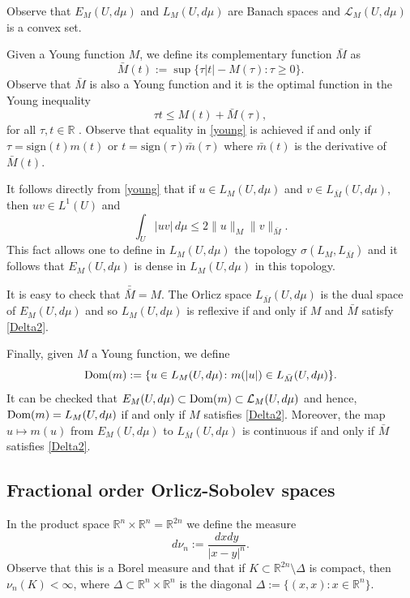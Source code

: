 \documentclass{amsart}
\def\Dom{\text{\normalfont Dom}}
\newcommand{\R}{{\mathbb R}}
\newcommand{\LL}{{\mathcal L}}
\theoremstyle{remark}
\theoremstyle{definition}
\numberwithin{equation}{section}
\begin{document}
Observe that $E_M(U,d\mu)$ and $L_M(U,d\mu)$ are Banach spaces and $\LL_M(U,d\mu)$ is a convex set.

\bigskip

Given a Young function $M$, we define its complementary function $\bar M$ as
$$
\bar M(t) := \sup\{ \tau|t|-M(\tau)\colon \tau\geq 0\}.
$$
Observe that $\bar M$ is also a Young function and it is the optimal function in the Young inequality
\begin{equation}\label{young}
\tau t\le M(t) + \bar M(\tau),
\end{equation}
for all $\tau,t\in \R$ . Observe that equality in \eqref{young} is achieved if and only if $\tau=\text{sign}(t)m(t)$ or $t=\text{sign}(\tau)\bar m(\tau)$ where $\bar{m}(t)$ is the derivative of $\bar{M}(t)$. 

It follows directly from \eqref{young} that if $u\in L_M(U,d\mu)$ and $v\in L_{\bar M}(U,d\mu)$, then $uv\in L^1(U)$ and
$$
\int_U |uv|\, d\mu \le 2 \|u\|_M \|v\|_{\bar M}.
$$
This fact allows one to define in $L_M(U,d\mu)$ the topology $\sigma(L_M,L_{\bar M})$ and it follows that $E_M(U,d\mu)$ is dense in $L_M(U,d\mu)$ in this topology.

It is easy to check that $\bar{\bar M} = M$. The Orlicz space $L_{\bar M}(U,d\mu)$ is the dual space of $E_M(U,d\mu)$ and so $L_M(U,d\mu)$ is reflexive if and only if $M$ and $\bar M$ satisfy \eqref{Delta2}.


Finally, given $M$ a Young function, we define
\begin{equation}\label{Domm}
\Dom(m) := \{u\in L_M(U,d\mu)\colon m(|u|)\in L_{\bar M}(U,d\mu)\}.
\end{equation}
It can be checked that $E_M(U,d\mu)\subset \Dom(m)\subset \LL_M(U,d\mu)$ and hence, $\Dom(m)=L_M(U,d\mu)$ if and only if $M$ satisfies \eqref{Delta2}. Moreover, the map $u\mapsto m(u)$ from $E_M(U,d\mu)$ to $L_{\bar M}(U,d\mu)$ is continuous if and only if $\bar M$ satisfies \eqref{Delta2}.


\subsection{Fractional order Orlicz-Sobolev spaces}
In the product space $\R^n\times\R^n = \R^{2n}$ we define the measure
$$
d\nu_n := \frac{dxdy}{|x-y|^n}.
$$
Observe that this is a Borel measure and that if $K\subset \R^{2n}\setminus \Delta$ is compact, then $\nu_n(K)<\infty$, where $\Delta\subset \R^n\times\R^n$ is the diagonal $
\Delta := \{(x,x)\colon x\in\R^n\}$.
\end{document}
